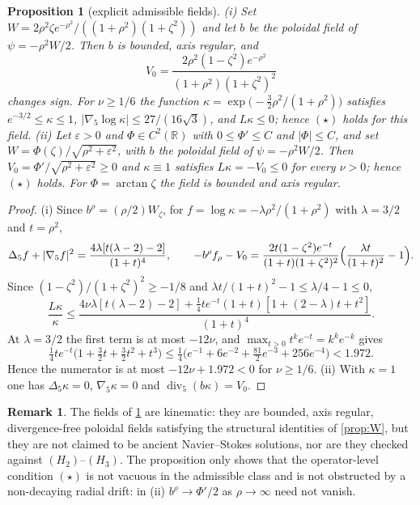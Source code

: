 \documentclass[11pt]{article}
\newtheorem{proposition}[theorem]{Proposition}
\theoremstyle{definition}
\newtheorem{remark}[theorem]{Remark}
\newcommand{\R}{\mathbb{R}}
\newcommand{\Div}{\operatorname{div}}
\begin{document}
\begin{proposition}[explicit admissible fields]\label{prop:examples}
(i) Set $W=2\rho^2\zeta e^{-\rho^2}/((1+\rho^2)(1+\zeta^2))$ and let $b$ be the
poloidal field of $\psi=-\rho^2W/2$. Then $b$ is bounded, axis regular, and
\begin{equation}\label{eq:field1}
V_0=\frac{2\rho^2(1-\zeta^2)e^{-\rho^2}}{(1+\rho^2)(1+\zeta^2)^2}
\end{equation}
changes sign. For $\nu\ge1/6$ the function
$\kappa=\exp\bigl(-\tfrac32\rho^2/(1+\rho^2)\bigr)$ satisfies
$e^{-3/2}\le\kappa\le1$, $|\nabla_5\log\kappa|\le27/(16\sqrt3)$, and
$L\kappa\le0$; hence $(\star)$ holds for this field.
(ii) Let $\varepsilon>0$ and $\Phi\in C^2(\R)$ with $0\le\Phi'\le C$ and
$|\Phi|\le C$, and set
$W=\Phi(\zeta)/\sqrt{\rho^2+\varepsilon^2}$, with $b$ the poloidal field of
$\psi=-\rho^2W/2$. Then $V_0=\Phi'/\sqrt{\rho^2+\varepsilon^2}\ge0$ and
$\kappa\equiv1$ satisfies $L\kappa=-V_0\le0$ for every $\nu>0$; hence
$(\star)$ holds. For $\Phi=\arctan\zeta$ the field is bounded and
axis regular.
\end{proposition}
\begin{proof}
(i) Since $b^\rho=(\rho/2)W_\zeta$, for
$f=\log\kappa=-\lambda\rho^2/(1+\rho^2)$ with $\lambda=3/2$ and $t=\rho^2$,
\begin{equation}
\Delta_5f+|\nabla_5f|^2=\frac{4\lambda[t(\lambda-2)-2]}{(1+t)^4},\qquad
-b^\rho f_\rho-V_0=\frac{2t(1-\zeta^2)e^{-t}}{(1+t)(1+\zeta^2)^2}
\Bigl(\frac{\lambda t}{(1+t)^2}-1\Bigr).
\end{equation}
Since $(1-\zeta^2)/(1+\zeta^2)^2\ge-1/8$ and
$\lambda t/(1+t)^2-1\le\lambda/4-1\le0$,
\begin{equation}
\frac{L\kappa}{\kappa}\le
\frac{4\nu\lambda[t(\lambda-2)-2]+\tfrac14te^{-t}(1+t)[1+(2-\lambda)t+t^2]}
{(1+t)^4}.
\end{equation}
At $\lambda=3/2$ the first term is at most $-12\nu$, and
$\max_{t>0}t^ke^{-t}=k^ke^{-k}$ gives
\begin{equation}
\tfrac14te^{-t}\bigl(1+\tfrac32t+\tfrac32t^2+t^3\bigr)
\le\tfrac14\bigl(e^{-1}+6e^{-2}+\tfrac{81}2e^{-3}+256e^{-4}\bigr)<1.972 .
\end{equation}
Hence the numerator is at most $-12\nu+1.972<0$ for $\nu\ge1/6$.
(ii) With $\kappa=1$ one has $\Delta_5\kappa=0$, $\nabla_5\kappa=0$ and
$\Div_5(b\kappa)=V_0$.
\end{proof}
\begin{remark}
The fields of \cref{prop:examples} are kinematic: they are bounded, axis
regular, divergence-free poloidal fields satisfying the structural identities
of \cref{prop:W}, but they are not claimed to be ancient Navier--Stokes
solutions, nor are they checked against $(H_2)$--$(H_3)$. The proposition only
shows that the operator-level condition $(\star)$ is not vacuous in the
admissible class and is not obstructed by a non-decaying radial drift: in (ii)
$b^\rho\to\Phi'/2$ as $\rho\to\infty$ need not vanish.
\end{remark}
\end{document}
